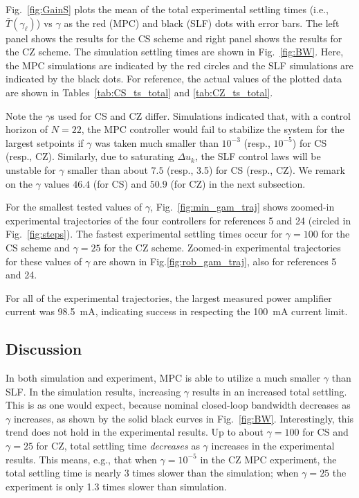 \documentclass[twocolumn,twoside]{IEEEtran}
\begin{document}
Fig.~\ref{fig:GainS} plots the mean of the total experimental settling times (i.e., $\bar{T}(\gamma_{\ell})$) vs $\gamma$ as the red (MPC) and black (SLF) dots with error bars. The left panel shows the results for the CS scheme and right panel shows the results for the CZ scheme.
The simulation settling times are shown in Fig.~\ref{fig:BW}. Here, the MPC simulations are indicated by the red circles and the SLF simulations are indicated by the black dots.
For reference, the actual values of the plotted data are shown in Tables~\ref{tab:CS_ts_total} and \ref{tab:CZ_ts_total}. 

Note the $\gamma$s used for CS and CZ differ. Simulations indicated that, with a control horizon of ${N=22}$, the MPC controller would fail to stabilize the system for the largest setpoints if $\gamma$ was taken much smaller than ${10^{-3}}$ (resp., ${10^{-5}}$) for CS (resp., CZ). Similarly, due to saturating $\Delta u_k$, the SLF control laws will be unstable for $\gamma$ smaller than about $7.5$ (resp., 3.5) for CS (resp., CZ). We remark on the $\gamma$ values $46.4$ (for CS) and $50.9$ (for CZ) in the next subsection.


For the smallest tested values of $\gamma$, Fig.~\ref{fig:min_gam_traj} shows zoomed-in experimental trajectories of the four controllers for references 5 and 24 (circled in Fig.~\ref{fig:steps}). The fastest experimental settling times occur for $\gamma=100$ for the CS scheme and $\gamma=25$ for the CZ scheme. Zoomed-in experimental trajectories for these values of $\gamma$ are shown in Fig.\ref{fig:rob_gam_traj}, also for references 5 and 24.

For all of the experimental trajectories, the largest measured power amplifier current was 98.5~mA, indicating success in respecting the 100~mA current limit.

\subsection{Discussion}\label{sec:res_disc}
In both simulation and experiment, MPC is able to utilize a much smaller $\gamma$ than SLF. In the simulation results, increasing $\gamma$ results in an increased total settling. This is as one would expect, because nominal closed-loop bandwidth decreases as $\gamma$ increases, as shown by the solid black curves in Fig.~\ref{fig:BW}. Interestingly, this trend does not hold in the experimental results. Up to about ${\gamma=100}$ for CS and ${\gamma=25}$ for CZ, total settling time \emph{decreases} as $\gamma$ increases in the experimental results. This means, e.g., that when ${\gamma=10^{-5}}$ in the CZ MPC experiment, the total settling time is nearly 3 times slower than the simulation; when ${\gamma=25}$ the experiment is only 1.3 times slower than simulation.
\end{document}
